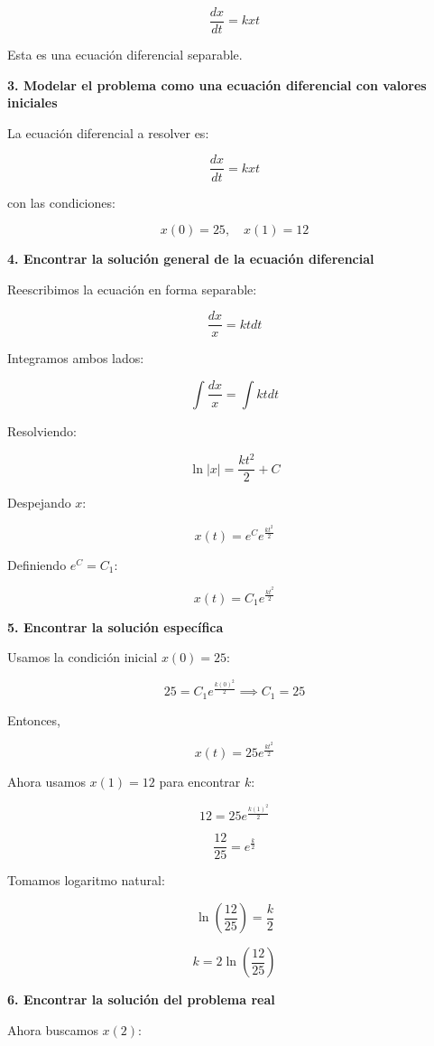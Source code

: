 \documentclass[answers]{exam}
\begin{document}
\[
	\frac{dx}{dt} = k x t
\]

Esta es una ecuación diferencial separable.

\vspace{0.3cm}
\textbf{3. Modelar el problema como una ecuación diferencial con valores iniciales}

La ecuación diferencial a resolver es:

\[
	\frac{dx}{dt} = k x t
\]

con las condiciones:

\[
	x(0) = 25, \quad x(1) = 12
\]

\vspace{0.3cm}
\textbf{4. Encontrar la solución general de la ecuación diferencial}

Reescribimos la ecuación en forma separable:

\[
	\frac{dx}{x} = k t dt
\]

Integramos ambos lados:

\[
	\int \frac{dx}{x} = \int k t dt
\]

Resolviendo:

\[
	\ln |x| = \frac{k t^2}{2} + C
\]

Despejando \( x \):

\[
	x(t) = e^{C} e^{\frac{k t^2}{2}}
\]

Definiendo \( e^C = C_1 \):

\[
	x(t) = C_1 e^{\frac{k t^2}{2}}
\]

\newpage
\textbf{5. Encontrar la solución específica}

Usamos la condición inicial \( x(0) = 25 \):

\[
	25 = C_1 e^{\frac{k(0)^2}{2}}
	\implies
	C_1 = 25
\]

Entonces,

\[
	x(t) = 25 e^{\frac{k t^2}{2}}
\]

Ahora usamos \( x(1) = 12 \) para encontrar \( k \):

\[
	12 = 25 e^{\frac{k (1)^2}{2}}
\]

\[
	\frac{12}{25} = e^{\frac{k}{2}}
\]

Tomamos logaritmo natural:

\[
	\ln \left(\frac{12}{25} \right) = \frac{k}{2}
\]

\[
	k = 2 \ln \left(\frac{12}{25} \right)
\]

\vspace{0.3cm}
\textbf{6. Encontrar la solución del problema real}

Ahora buscamos \( x(2) \):
\end{document}
